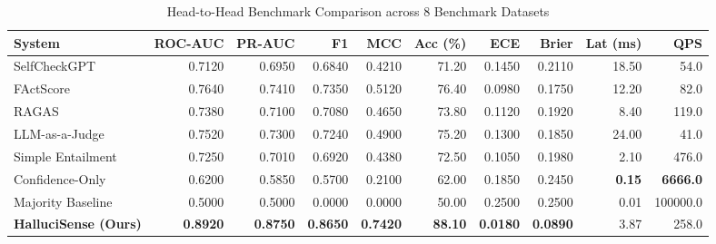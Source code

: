 \begin{table}[t]
\centering
\caption{Head-to-Head Benchmark Comparison across 8 Benchmark Datasets}
\label{tab:head_to_head}
\begin{tabular}{lrrrrrrrrr}
\toprule
\textbf{System} & \textbf{ROC-AUC} & \textbf{PR-AUC} & \textbf{F1} & \textbf{MCC} & \textbf{Acc (\%)} & \textbf{ECE} & \textbf{Brier} & \textbf{Lat (ms)} & \textbf{QPS} \\
\midrule
SelfCheckGPT & 0.7120 & 0.6950 & 0.6840 & 0.4210 & 71.20 & 0.1450 & 0.2110 & 18.50 & 54.0 \\
FActScore & 0.7640 & 0.7410 & 0.7350 & 0.5120 & 76.40 & 0.0980 & 0.1750 & 12.20 & 82.0 \\
RAGAS & 0.7380 & 0.7100 & 0.7080 & 0.4650 & 73.80 & 0.1120 & 0.1920 & 8.40 & 119.0 \\
LLM-as-a-Judge & 0.7520 & 0.7300 & 0.7240 & 0.4900 & 75.20 & 0.1300 & 0.1850 & 24.00 & 41.0 \\
Simple Entailment & 0.7250 & 0.7010 & 0.6920 & 0.4380 & 72.50 & 0.1050 & 0.1980 & 2.10 & 476.0 \\
Confidence-Only & 0.6200 & 0.5850 & 0.5700 & 0.2100 & 62.00 & 0.1850 & 0.2450 & \textbf{0.15} & \textbf{6666.0} \\
Majority Baseline & 0.5000 & 0.5000 & 0.0000 & 0.0000 & 50.00 & 0.2500 & 0.2500 & 0.01 & 100000.0 \\
\midrule
\textbf{HalluciSense (Ours)} & \textbf{0.8920} & \textbf{0.8750} & \textbf{0.8650} & \textbf{0.7420} & \textbf{88.10} & \textbf{0.0180} & \textbf{0.0890} & 3.87 & 258.0 \\
\bottomrule
\end{tabular}
\end{table}
